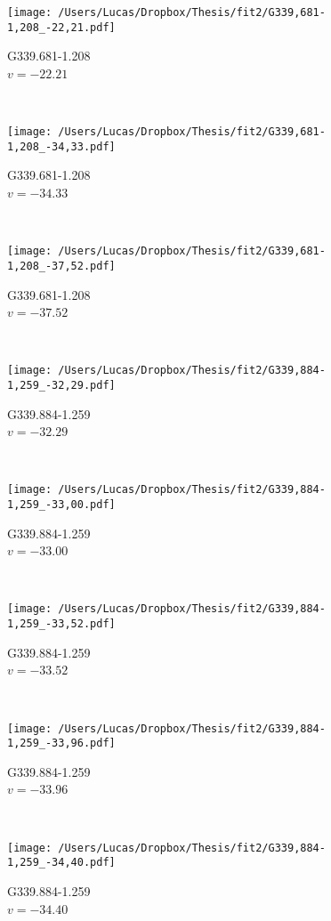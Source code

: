 \begin{figure*}[t]\ContinuedFloat
	\centering
	\begin{subfigure}[t]{0.3\textwidth}
		\texttt{[image: /Users/Lucas/Dropbox/Thesis/fit2/G339,681-1,208\_-22,21.pdf]}
		\caption[]{G339.681-1.208\\$v=-22.21$\,\kms}
	\end{subfigure}
	~
	\begin{subfigure}[t]{0.3\textwidth}
		\texttt{[image: /Users/Lucas/Dropbox/Thesis/fit2/G339,681-1,208\_-34,33.pdf]}
		\caption[]{G339.681-1.208\\$v=-34.33$\,\kms}
	\end{subfigure}
	~
	\begin{subfigure}[t]{0.3\textwidth}
		\texttt{[image: /Users/Lucas/Dropbox/Thesis/fit2/G339,681-1,208\_-37,52.pdf]}
		\caption[]{G339.681-1.208\\$v=-37.52$\,\kms}
	\end{subfigure}
	~
	\begin{subfigure}[t]{0.3\textwidth}
		\texttt{[image: /Users/Lucas/Dropbox/Thesis/fit2/G339,884-1,259\_-32,29.pdf]}
		\caption[]{G339.884-1.259\\$v=-32.29$\,\kms}
	\end{subfigure}
	~
	\begin{subfigure}[t]{0.3\textwidth}
		\texttt{[image: /Users/Lucas/Dropbox/Thesis/fit2/G339,884-1,259\_-33,00.pdf]}
		\caption[]{G339.884-1.259\\$v=-33.00$\,\kms}
	\end{subfigure}
	~
	\begin{subfigure}[t]{0.3\textwidth}
		\texttt{[image: /Users/Lucas/Dropbox/Thesis/fit2/G339,884-1,259\_-33,52.pdf]}
		\caption[]{G339.884-1.259\\$v=-33.52$\,\kms}
	\end{subfigure}
	~
	\begin{subfigure}[t]{0.3\textwidth}
		\texttt{[image: /Users/Lucas/Dropbox/Thesis/fit2/G339,884-1,259\_-33,96.pdf]}
		\caption[]{G339.884-1.259\\$v=-33.96$\,\kms}
	\end{subfigure}
	~
	\begin{subfigure}[t]{0.3\textwidth}
		\texttt{[image: /Users/Lucas/Dropbox/Thesis/fit2/G339,884-1,259\_-34,40.pdf]}
		\caption[]{G339.884-1.259\\$v=-34.40$\,\kms}

\end{subfigure}
\end{figure*}
